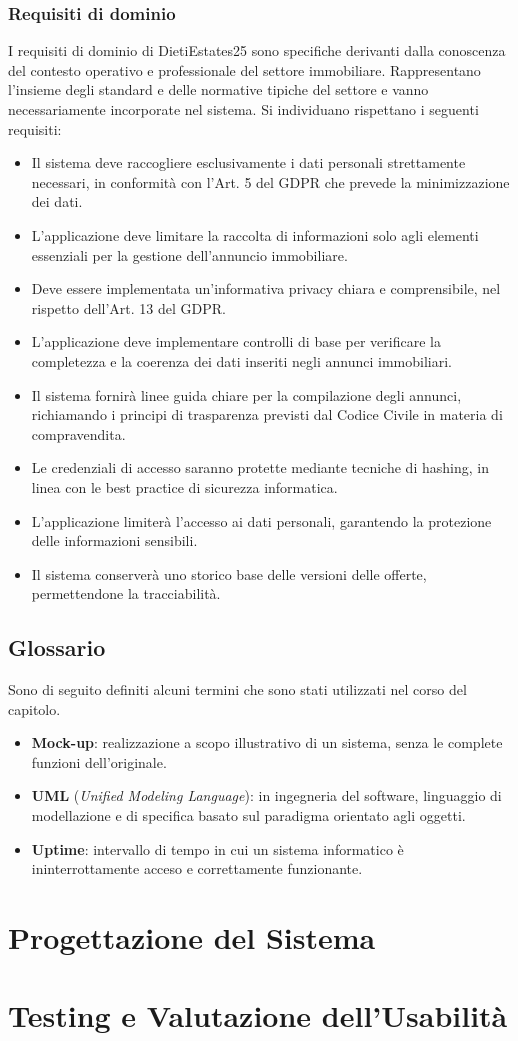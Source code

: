 \documentclass{book}
\begin{document}
\subsection{Requisiti di dominio}
I requisiti di dominio di DietiEstates25 sono specifiche derivanti dalla conoscenza del contesto operativo e professionale del settore immobiliare. Rappresentano l'insieme degli standard e delle normative tipiche del settore e vanno necessariamente incorporate nel sistema. Si individuano rispettano i seguenti requisiti:
\begin{itemize}
    \item Il sistema deve raccogliere esclusivamente i dati personali strettamente necessari, in conformità con l'Art. 5 del GDPR che prevede la minimizzazione dei dati.
    \item L'applicazione deve limitare la raccolta di informazioni solo agli elementi essenziali per la gestione dell'annuncio immobiliare.
    \item Deve essere implementata un'informativa privacy chiara e comprensibile, nel rispetto dell'Art. 13 del GDPR\@.
    \item L'applicazione deve implementare controlli di base per verificare la completezza e la coerenza dei dati inseriti negli annunci immobiliari.
    \item Il sistema fornirà linee guida chiare per la compilazione degli annunci, richiamando i principi di trasparenza previsti dal Codice Civile in materia di compravendita.
    \item Le credenziali di accesso saranno protette mediante tecniche di hashing, in linea con le best practice di sicurezza informatica.
    \item L'applicazione limiterà l'accesso ai dati personali, garantendo la protezione delle informazioni sensibili.
    \item Il sistema conserverà uno storico base delle versioni delle offerte, permettendone la tracciabilità. %
\end{itemize}

\section{Glossario}
Sono di seguito definiti alcuni termini che sono stati utilizzati nel corso del capitolo.
\begin{itemize}
    \item \textbf{Mock-up}: realizzazione a scopo illustrativo di un sistema, senza le complete funzioni dell'originale.
    \item \textbf{UML} (\textit{Unified Modeling Language}): in ingegneria del software, linguaggio di modellazione e di specifica basato sul paradigma orientato agli oggetti.
    \item \textbf{Uptime}: intervallo di tempo in cui un sistema informatico è ininterrottamente acceso e correttamente funzionante.
\end{itemize}


\chapter{Progettazione del Sistema}
\chapter{Testing e Valutazione dell'Usabilità}
\end{document}

